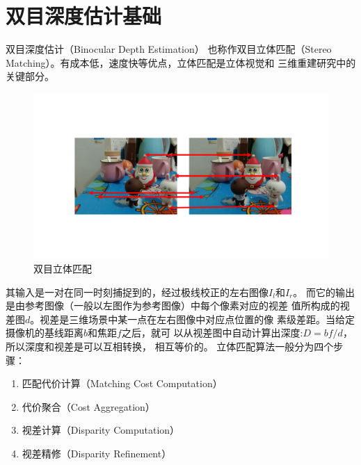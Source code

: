 \section{双目深度估计基础}
双目深度估计（Binocular Depth Estimation）
也称作双目立体匹配（Stereo Matching）。有成本低，速度快等优点，立体匹配是立体视觉和
三维重建研究中的关键部分。
\begin{figure}
    \centering
    \includegraphics[width=0.8\linewidth]{figure/stereo_match.pdf}
    \caption{双目立体匹配}
    \label{stereo}
\end{figure}
其输入是一对在同一时刻捕捉到的，经过极线校正的左右图像$I_l$和$I_r$。
而它的输出是由参考图像（一般以左图作为参考图像）中每个像素对应的视差
值所构成的视差图$d$。视差是三维场景中某一点在左右图像中对应点位置的像
素级差距。当给定摄像机的基线距离$b$和焦距$f$之后，就可
以从视差图中自动计算出深度:$D = bf/d$，所以深度和视差是可以互相转换，
相互等价的。
立体匹配算法一般分为四个步骤：
\begin{enumerate}
	\item 匹配代价计算（Matching Cost Computation）
	\item 代价聚合（Cost Aggregation）
	\item 视差计算（Disparity Computation）
	\item 视差精修（Disparity Refinement）
\end{enumerate}

